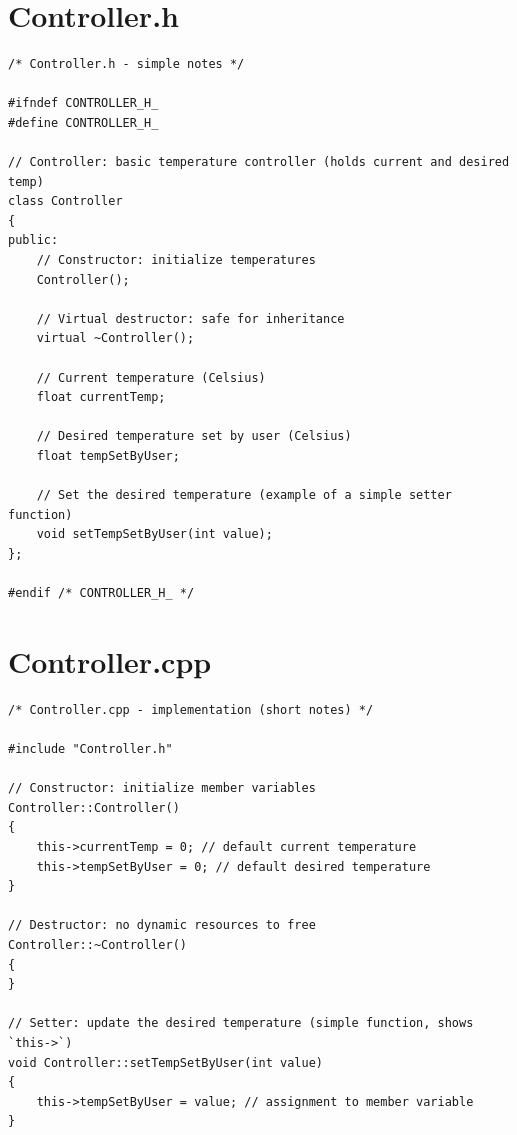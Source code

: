 \documentclass[11pt]{article}
\begin{document}
\section*{Controller.h}
\begin{lstlisting}
/* Controller.h - simple notes */

#ifndef CONTROLLER_H_
#define CONTROLLER_H_

// Controller: basic temperature controller (holds current and desired temp)
class Controller
{
public:
    // Constructor: initialize temperatures
    Controller();

    // Virtual destructor: safe for inheritance
    virtual ~Controller();

    // Current temperature (Celsius)
    float currentTemp;

    // Desired temperature set by user (Celsius)
    float tempSetByUser;

    // Set the desired temperature (example of a simple setter function)
    void setTempSetByUser(int value);
};

#endif /* CONTROLLER_H_ */
\end{lstlisting}

\section*{Controller.cpp}
\begin{lstlisting}
/* Controller.cpp - implementation (short notes) */

#include "Controller.h"

// Constructor: initialize member variables
Controller::Controller()
{
    this->currentTemp = 0; // default current temperature
    this->tempSetByUser = 0; // default desired temperature
}

// Destructor: no dynamic resources to free
Controller::~Controller()
{
}

// Setter: update the desired temperature (simple function, shows `this->`)
void Controller::setTempSetByUser(int value)
{
    this->tempSetByUser = value; // assignment to member variable
}
\end{lstlisting}
\end{document}

